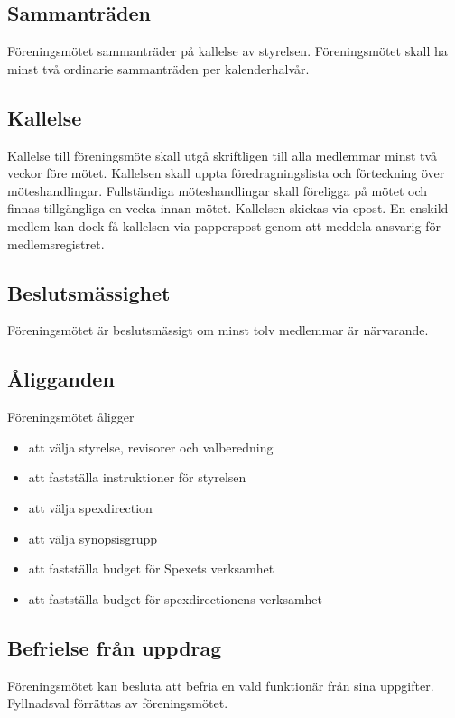 \documentclass[a4paper]{article}
\begin{document}
\subsection{Sammanträden}
Föreningsmötet sammanträder på kallelse av styrelsen. Föreningsmötet skall ha minst två ordinarie sammanträden per kalenderhalvår.

\subsection{Kallelse}
Kallelse till föreningsmöte skall utgå skriftligen till alla medlemmar minst två veckor före mötet. Kallelsen skall uppta föredragningslista och förteckning över möteshandlingar. Fullständiga möteshandlingar skall föreligga på mötet och finnas tillgängliga en vecka innan mötet.\newline
\newline
Kallelsen skickas via epost. En enskild medlem kan dock få kallelsen via papperspost genom att meddela ansvarig för medlemsregistret.

\subsection{Beslutsmässighet}
Föreningsmötet är beslutsmässigt om minst tolv medlemmar är närvarande.

\subsection{Åligganden}
Föreningsmötet åligger

\begin{itemize}
  \item att välja styrelse, revisorer och valberedning
  \item att fastställa instruktioner för styrelsen
  \item att välja spexdirection
  \item att välja synopsisgrupp
  \item att fastställa budget för Spexets verksamhet
  \item att fastställa budget för spexdirectionens verksamhet
\end{itemize}

\subsection{Befrielse från uppdrag}
Föreningsmötet kan besluta att befria en vald funktionär från sina uppgifter. Fyllnadsval förrättas av föreningsmötet.
\end{document}
